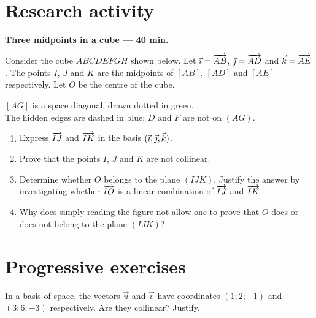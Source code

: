 \section{Research activity}\textbf{Three midpoints in a cube --- 40 min.}\par Consider the cube $ABCDEFGH$ shown below. Let $\vec{\imath}=\overrightarrow{AB}$, $\vec{\jmath}=\overrightarrow{AD}$ and $\vec k=\overrightarrow{AE}$. The points $I$, $J$ and $K$ are the midpoints of $[AB]$, $[AD]$ and $[AE]$ respectively. Let $O$ be the centre of the cube.
\begin{center}\par\small $[AG]$ is a space diagonal, drawn dotted in green.\\The hidden edges are dashed in blue; $D$ and $F$ are not on $(AG)$.\end{center}
\begin{enumerate}\item Express $\overrightarrow{IJ}$ and $\overrightarrow{IK}$ in the basis $(\vec{\imath},\vec{\jmath},\vec k)$.
\item Prove that the points $I$, $J$ and $K$ are not collinear.
\item Determine whether $O$ belongs to the plane $(IJK)$. Justify the answer by investigating whether $\overrightarrow{IO}$ is a linear combination of $\overrightarrow{IJ}$ and $\overrightarrow{IK}$.
\item Why does simply reading the figure not allow one to prove that $O$ does or does not belong to the plane $(IJK)$?\end{enumerate}

\section{Progressive exercises}

In a basis of space, the vectors $\vec u$ and $\vec v$ have coordinates $(1;2;-1)$ and $(3;6;-3)$ respectively. Are they collinear? Justify.

